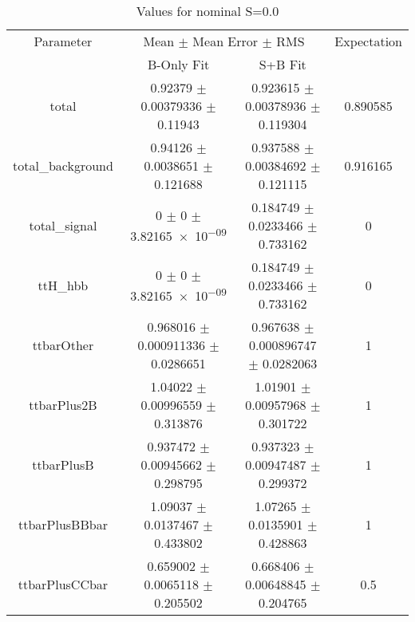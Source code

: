\begin{table}
\centering
\caption{Values for nominal S=0.0}
\begin{tabular}{cccc}
\toprule
Parameter & \multicolumn{2}{c}{Mean $\pm$ Mean Error $\pm$ RMS} & Expectation\\
 & B-Only Fit & S+B Fit & \\
\midrule
total & \num{0.92379} $\pm$ \num{0.00379336} $\pm$ \num{0.11943} & \num{0.923615} $\pm$ \num{0.00378936} $\pm$ \num{0.119304} & \num{0.890585}\\
total\_background & \num{0.94126} $\pm$ \num{0.0038651} $\pm$ \num{0.121688} & \num{0.937588} $\pm$ \num{0.00384692} $\pm$ \num{0.121115} & \num{0.916165}\\
total\_signal & \num{0} $\pm$ \num{0} $\pm$ \num{3.82165e-09} & \num{0.184749} $\pm$ \num{0.0233466} $\pm$ \num{0.733162} & \num{0}\\
ttH\_hbb & \num{0} $\pm$ \num{0} $\pm$ \num{3.82165e-09} & \num{0.184749} $\pm$ \num{0.0233466} $\pm$ \num{0.733162} & \num{0}\\
ttbarOther & \num{0.968016} $\pm$ \num{0.000911336} $\pm$ \num{0.0286651} & \num{0.967638} $\pm$ \num{0.000896747} $\pm$ \num{0.0282063} & \num{1}\\
ttbarPlus2B & \num{1.04022} $\pm$ \num{0.00996559} $\pm$ \num{0.313876} & \num{1.01901} $\pm$ \num{0.00957968} $\pm$ \num{0.301722} & \num{1}\\
ttbarPlusB & \num{0.937472} $\pm$ \num{0.00945662} $\pm$ \num{0.298795} & \num{0.937323} $\pm$ \num{0.00947487} $\pm$ \num{0.299372} & \num{1}\\
ttbarPlusBBbar & \num{1.09037} $\pm$ \num{0.0137467} $\pm$ \num{0.433802} & \num{1.07265} $\pm$ \num{0.0135901} $\pm$ \num{0.428863} & \num{1}\\
ttbarPlusCCbar & \num{0.659002} $\pm$ \num{0.0065118} $\pm$ \num{0.205502} & \num{0.668406} $\pm$ \num{0.00648845} $\pm$ \num{0.204765} & \num{0.5}\\
\bottomrule
\end{tabular}
\end{table}